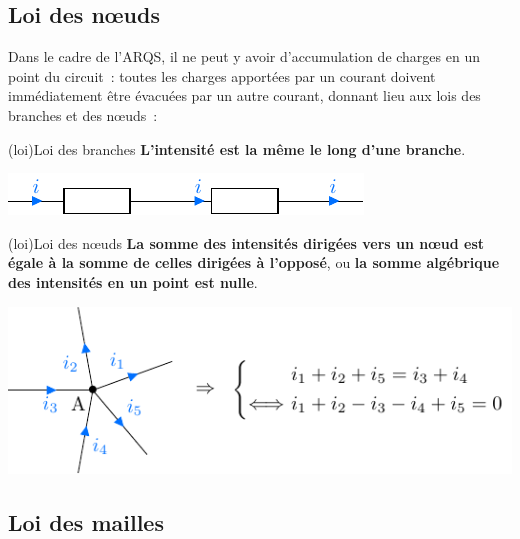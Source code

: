 \documentclass[../../main/main.tex]{subfiles}
\begin{document}
\subsection{Loi des nœuds}

Dans le cadre de l'ARQS, il ne peut y avoir d'accumulation de charges en un
point du circuit~: toutes les charges apportées par un courant doivent
immédiatement être évacuées par un autre courant, donnant lieu aux lois des
branches et des nœuds~:
\begin{tcb}[label=loi:branche, sidebyside, halign upper=center](loi){Loi des branches}
	\textbf{L'intensité est la même le long d'une branche}.
	\tcblower
	\begin{center}
		\includegraphics[width=\linewidth]{ldb}
	\end{center}
\end{tcb}
\begin{tcb}[label=loi:noeud, sidebyside, halign upper=center](loi){Loi des nœuds}
	\textbf{La somme des intensités dirigées vers un nœud est égale à la somme de
		celles dirigées à l'opposé}, ou \textbf{la somme algébrique des intensités
		en un point est nulle}.
	\tcblower
	\begin{center}
		\includegraphics[width=\linewidth]{ldn}
	\end{center}
\end{tcb}

\subsection{Loi des mailles}
\end{document}
